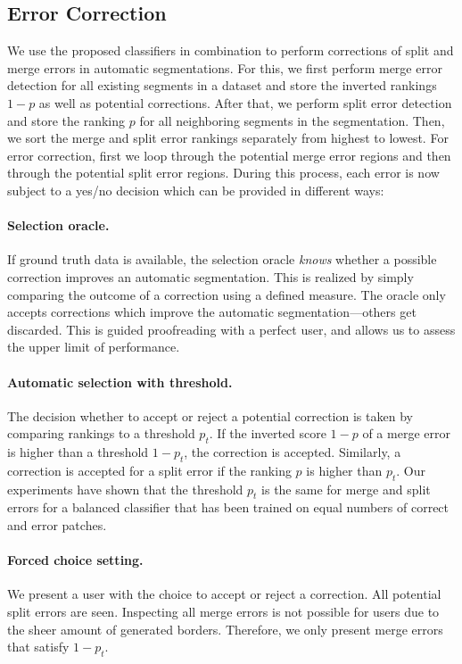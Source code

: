 \subsection{Error Correction}
\label{sec:errorcorrection}

We use the proposed classifiers in combination to perform corrections of split and merge errors in automatic segmentations. For this, we first perform merge error detection for all existing segments in a dataset and store the inverted rankings $1-p$ as well as potential corrections. After that, we perform split error detection and store the ranking $p$ for all neighboring segments in the segmentation. Then, we sort the merge and split error rankings separately from highest to lowest. For error correction, first we loop through the potential merge error regions and then through the potential split error regions. During this process, each error is now subject to a yes/no decision which can be provided in different ways:

\paragraph{Selection oracle.} If ground truth data is available, the selection oracle \textit{knows} whether a possible correction improves an automatic segmentation. This is realized by simply comparing the outcome of a correction using a defined measure. The oracle only accepts corrections which improve the automatic segmentation---others get
discarded. This is guided proofreading with a perfect user, and allows us to assess the upper limit of performance.

\paragraph{Automatic selection with threshold.} The decision whether to accept or reject a potential correction is taken by comparing rankings to a threshold $p_t$. If the inverted score $1-p$ of a merge error is higher than a threshold $1-p_t$, the correction is accepted. Similarly, a correction is accepted for a split error if the ranking $p$ is higher than $p_t$. Our experiments have shown that the threshold $p_t$ is the same for merge and split errors for a balanced classifier that has been trained on equal numbers of correct and error patches.

\paragraph{Forced choice setting.} We present a user with the choice to accept or reject a correction. All potential split errors are seen. Inspecting all merge errors is not possible for users due to the sheer amount of generated borders. Therefore, we only present merge errors that satisfy $1-p_t$.

